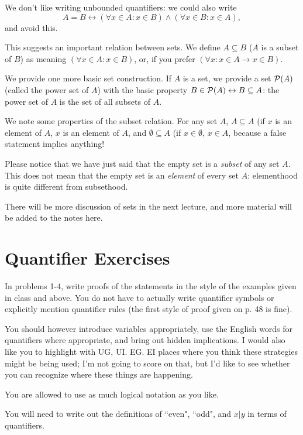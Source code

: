 \documentclass[12pt]{article}
\begin{document}
We don't like writing unbounded quantifiers:  we could also write $$A = B \leftrightarrow (\forall x \in A:x \in B) \wedge (\forall x \in B:x \in A),$$ and avoid this.

This suggests an important relation between sets.  We define $A \subseteq B$ ($A$ is a subset of $B$) as meaning $(\forall x \in A:x \in B)$, or, if you prefer $(\forall x:x \in A \rightarrow x \in B)$.

We provide one more basic set construction.  If $A$ is a set, we provide a set ${\cal P}(A)$ (called the power set of $A$) with the basic property $B \in {\cal P}(A) \leftrightarrow B \subseteq A$:  the power set of $A$ is the set of all subsets of $A$.

We note some properties of the subset relation.  For any set $A$, $A \subseteq A$ (if $x$ is an element of $A$, $x$ is an element of $A$, and $\emptyset \subseteq A$ (if $x \in \emptyset$, $x \in A$, because a false statement implies anything!

Please notice that we have just said that the empty set is a {\em subset\/} of any set $A$.  This does not mean that the empty set is an {\em element\/} of every set $A$:  elementhood is quite different from subsethood.  

There will be more discussion of sets in the next lecture, and more material will be added to the notes here.

\section{Quantifier Exercises}

In problems 1-4, write proofs of the statements in the style of the examples given in class and above.  You do not have to actually write quantifier symbols or explicitly mention quantifier rules (the first style of proof given on p. 48  is fine).



You should however introduce variables appropriately, use the English words for quantifiers where appropriate, and bring out hidden implications.  I would also like you to highlight with UG, UI. EG. EI places where you think these strategies might be being used;  I'm not going to score on that, but I'd like to see whether you can recognize where these things are happening.

You are allowed to use as much logical notation as you like.

You will need to write out the definitions of ``even", ``odd", and $x | y$ in terms of quantifiers.
\end{document}
